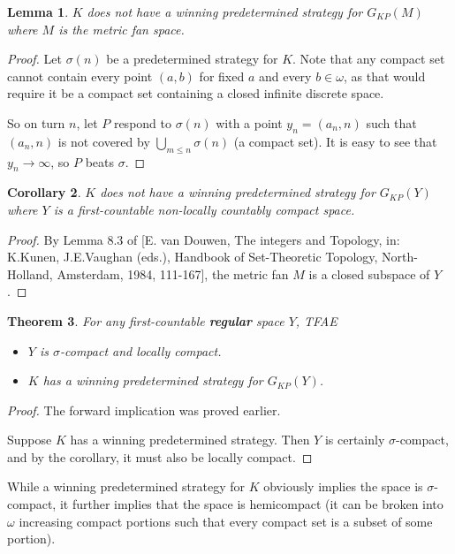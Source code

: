 \documentclass[11pt]{article}
\theoremstyle{plain}
\newtheorem{theorem}{Theorem}
\newtheorem{lemma}[theorem]{Lemma}
\newtheorem{corollary}[theorem]{Corollary}
\theoremstyle{definition}
\theoremstyle{remark}
\begin{document}
\begin{lemma}
$K$ does not have a winning predetermined strategy for $G_{KP}(M)$ where $M$ is the metric fan space.
\end{lemma}

\begin{proof}
Let $\sigma(n)$ be a predetermined strategy for $K$. Note that any compact set cannot contain every point $(a,b)$ for fixed $a$ and every $b\in \omega$, as that would require it be a compact set containing a closed infinite discrete space.

So on turn $n$, let $P$ respond to $\sigma(n)$ with a point $y_n=(a_n,n)$ such that $(a_n,n)$ is not covered by $\bigcup_{m\leq n} \sigma(n)$ (a compact set). It is easy to see that $y_n\rightarrow \infty$, so $P$ beats $\sigma$.
\end{proof}

\begin{corollary}
$K$ does not have a winning predetermined strategy for $G_{KP}(Y)$ where $Y$ is a first-countable non-locally countably compact space.
\end{corollary}

\begin{proof}
By Lemma 8.3 of [E. van Douwen, The integers and Topology, in: K.Kunen, J.E.Vaughan (eds.), Handbook of Set-Theoretic Topology, North-Holland, Amsterdam, 1984, 111-167], the metric fan $M$ is a closed subspace of $Y$.
\end{proof}

\begin{theorem}
For any first-countable \textbf{regular} space $Y$, TFAE
  \begin{itemize}
  \item $Y$ is $\sigma$-compact and locally compact.
  \item $K$ has a winning predetermined strategy for $G_{KP}(Y)$.
  \end{itemize}
\end{theorem}

\begin{proof}
The forward implication was proved earlier.

Suppose $K$ has a winning predetermined strategy. Then $Y$ is certainly $\sigma$-compact, and by the corollary, it must also be locally compact.
\end{proof}

While a winning predetermined strategy for $K$ obviously implies the space is $\sigma$-compact, it further implies that the space is hemicompact (it can be broken into $\omega$ increasing compact portions such that every compact set is a subset of some portion).
\end{document}

